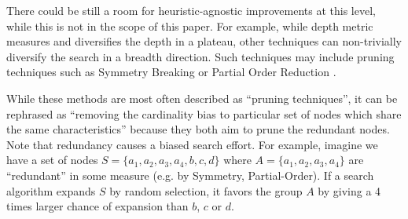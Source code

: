 There could be still a room for heuristic-agnostic improvements at
this level, while this is not in the scope of this paper.
For example, while depth metric measures and diversifies the depth in a plateau,
other techniques can non-trivially diversify the search in a breadth direction.
Such techniques may include pruning techniques such as 
Symmetry Breaking \cite{Fox1998,pochter2011exploiting,domshlak2013symmetry}
or Partial Order Reduction \cite{hall2013faster,wehrle2013relative}.

While these methods are most often described as ``pruning techniques'',
it can be rephrased as ``removing the cardinality bias to particular set
of nodes which share the same characteristics'' because they both aim to
prune the redundant nodes. Note that redundancy causes a biased 
search effort. For example, imagine we have a
set of nodes $S=\{a_1, a_2, a_3, a_4, b, c, d\}$ where
$A=\{a_1, a_2, a_3, a_4\}$ are ``redundant'' in some measure (e.g. by Symmetry,
Partial-Order). 
If a search algorithm expands $S$ by random selection, it favors the
group $A$ by giving a 4 times larger chance of expansion than $b$,
$c$ or $d$.




